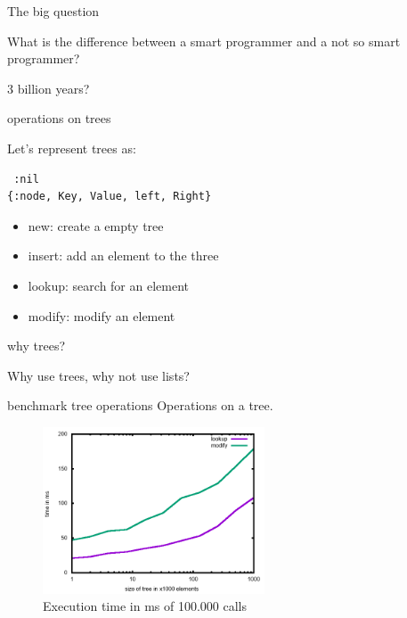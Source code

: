 \begin{frame}{The big question}

What is the difference between a smart programmer and a not so smart programmer?

\vspace{60pt}
\pause \centerline{3 billion years?}

\end{frame}

\begin{frame}[fragile]{operations on trees}

  Let's represent trees as:
  \vspace{10pt}
  
\begin{verbatim}
 :nil
{:node, Key, Value, left, Right}
\end{verbatim}

\pause \vspace{20pt}
\begin{itemize}
\item new: create a empty tree
\item insert: add an element to the three
\item lookup: search for an element 
\item modify: modify an element
\end{itemize}

\end{frame}

\begin{frame}{why trees?}

Why use trees, why not use lists?

\end{frame}

\begin{frame}{benchmark tree operations}
 Operations on a tree.
 \begin{figure}
  \centering
  \includegraphics[height=140pt]{tree.png}
  \caption{Execution time in ms of 100.000 calls}
 \end{figure}

\end{frame}

